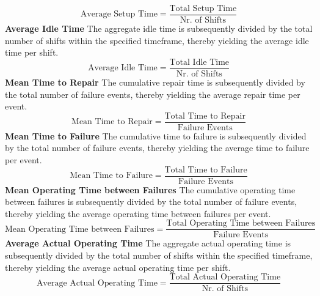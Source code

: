 {\[
\text{Average Setup Time} = \frac{\text{Total Setup Time}}{\text{Nr. of Shifts}}
\]
\textbf{Average Idle Time}
The aggregate idle time is subsequently divided by the total number of shifts within the specified timeframe, thereby yielding the average idle time per shift.
\[
\text{Average Idle Time} = \frac{\text{Total Idle Time}}{\text{Nr. of Shifts}}
\]
\textbf{Mean Time to Repair}
The cumulative repair time is subsequently divided by the total number of failure events, thereby yielding the average repair time per event.
\[
\text{Mean Time to Repair} = \frac{\text{Total Time to Repair}}{\text{Failure Events}}
\]
\textbf{Mean Time to Failure}
The cumulative time to failure is subsequently divided by the total number of failure events, thereby yielding the average time to failure per event.
\[
\text{Mean Time to Failure} = \frac{\text{Total Time to Failure}}{\text{Failure Events}}
\]
\textbf{Mean Operating Time between Failures}
The cumulative operating time between failures is subsequently divided by the total number of failure events, thereby yielding the average operating time between failures per event.
\[
\text{Mean Operating Time between Failures} = \frac{\text{Total Operating Time between Failures}}{\text{Failure Events}}
\]
\textbf{Average Actual Operating Time}
The aggregate actual operating time is subsequently divided by the total number of shifts within the specified timeframe, thereby yielding the average actual operating time per shift.
\[
\text{Average Actual Operating Time} = \frac{\text{Total Actual Operating Time}}{\text{Nr. of Shifts}}
\]

}
